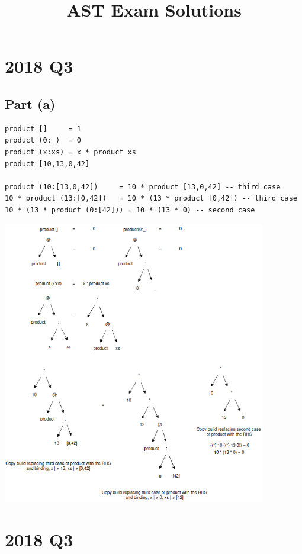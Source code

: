 \documentclass[11pt]{article}
\date{}
\title{AST Exam Solutions}
\begin{document}
\maketitle
\section{2018 Q3}
\label{sec:org8e3045b}
\subsection{Part (a)}
\label{sec:org2b0977c}
\begin{verbatim}
product []     = 1
product (0:_)  = 0
product (x:xs) = x * product xs
product [10,13,0,42]

product (10:[13,0,42])     = 10 * product [13,0,42] -- third case
10 * product (13:[0,42])   = 10 * (13 * product [0,42]) -- third case
10 * (13 * product (0:[42])) = 10 * (13 * 0) -- second case
\end{verbatim}
\begin{center}
\includegraphics[width=115mm]{./product-xs.png}
\end{center}
\section{2018 Q3}
\label{sec:org674e1c4}
\end{document}
